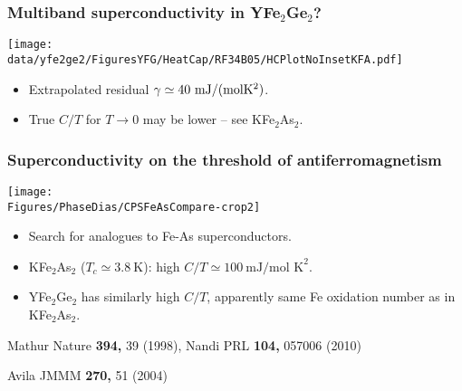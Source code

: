 \begin{frame}[label=YFGHeatCap3]
\frametitle{Multiband superconductivity in YFe$_2$Ge$_2$?}
\centerline{\texttt{[image: \\data/yfe2ge2/FiguresYFG/HeatCap/RF34B05/HCPlotNoInsetKFA.pdf]}}

\begin{itemize}
\item 
Extrapolated residual $\gamma \simeq 40~{\rm mJ/(mol K^2)}$.

\item
True $C/T$ for $T \rightarrow 0$ may be lower -- see KFe$_2$As$_2$.

\end{itemize}

\end{frame}




\begin{frame}[label=YFGIntro1]
\frametitle{Superconductivity on the threshold of antiferromagnetism}
\centerline{\texttt{[image: \\Figures/PhaseDias/CPSFeAsCompare-crop2]}}

\begin{itemize}

\item
Search for analogues to Fe-As superconductors.

\item
KFe$_2$As$_2$ ($T_c \simeq 3.8 ~\text{K}$): high $C/T \simeq 100
~\text{mJ/mol K}^{2}$.

\item
YFe$_2$Ge$_2$ has similarly high $C/T$, apparently same Fe oxidation
number as in
KFe$_2$As$_2$.

\end{itemize}

\vspace*{\fill}
\centerline{\makebox[\linewidth]{\rule{0.85\textwidth}{0.4pt}}}
\centerline{\scriptsize Mathur Nature {\bf 394,} 39 (1998), Nandi PRL
  {\bf 104,} 057006 (2010)}
\centerline{\scriptsize Avila JMMM {\bf 270,} 51 (2004)}
\end{frame}

